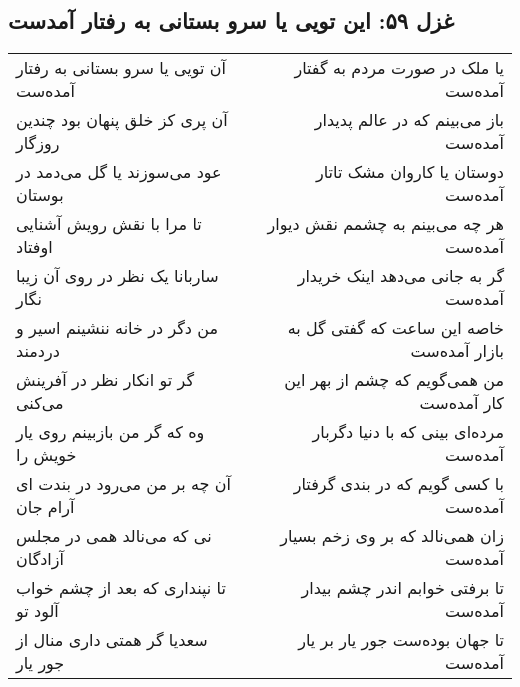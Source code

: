 \begin{center}
\section*{غزل ۵۹: این تویی یا سرو بستانی به رفتار آمدست}
\label{sec:059}
\begin{longtable}{l p{0.5cm} r}
آن تویی یا سرو بستانی به رفتار آمده‌ست
&&
یا ملک در صورت مردم به گفتار آمده‌ست
\\
آن پری کز خلق پنهان بود چندین روزگار
&&
باز می‌بینم که در عالم پدیدار آمده‌ست
\\
عود می‌سوزند یا گل می‌دمد در بوستان
&&
دوستان یا کاروان مشک تاتار آمده‌ست
\\
تا مرا با نقش رویش آشنایی اوفتاد
&&
هر چه می‌بینم به چشمم نقش دیوار آمده‌ست
\\
ساربانا یک نظر در روی آن زیبا نگار
&&
گر به جانی می‌دهد اینک خریدار آمده‌ست
\\
من دگر در خانه ننشینم اسیر و دردمند
&&
خاصه این ساعت که گفتی گل به بازار آمده‌ست
\\
گر تو انکار نظر در آفرینش می‌کنی
&&
من همی‌گویم که چشم از بهر این کار آمده‌ست
\\
وه که گر من بازبینم روی یار خویش را
&&
مرده‌ای بینی که با دنیا دگربار آمده‌ست
\\
آن چه بر من می‌رود در بندت ای آرام جان
&&
با کسی گویم که در بندی گرفتار آمده‌ست
\\
نی که می‌نالد همی در مجلس آزادگان
&&
زان همی‌نالد که بر وی زخم بسیار آمده‌ست
\\
تا نپنداری که بعد از چشم خواب آلود تو
&&
تا برفتی خوابم اندر چشم بیدار آمده‌ست
\\
سعدیا گر همتی داری منال از جور یار
&&
تا جهان بوده‌ست جور یار بر یار آمده‌ست
\\
\end{longtable}
\end{center}
